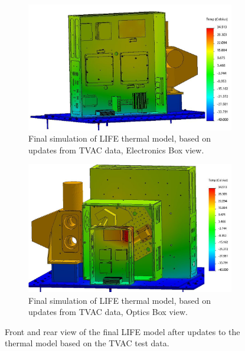 \begin{figure}
    \centering
    \begin{subfigure}[h]{0.9\textwidth}
        \centering
        \includegraphics[width=\textwidth]{chap3_images/LIFE_FINAL_SIMS/Test_22_EBox_FIXED.png}
        \caption{Final simulation of LIFE thermal model, based on updates from TVAC data, Electronics Box view.}
        \label{fig:LIFE_V5_FINAL_TVAC_TA_EBOX}
    \end{subfigure}
    \begin{subfigure}[h]{0.9\textwidth}
        \centering
        \includegraphics[width=\textwidth]{chap3_images/LIFE_FINAL_SIMS/Test_22_BBEbox_FIXED.png}
        \caption{Final simulation of LIFE thermal model, based on updates from TVAC data, Optics Box view.}
        \label{fig:LIFE_V5_FINAL_TVAC_TA_OBOX}
    \end{subfigure}
    \caption{Front and rear view of the final LIFE model after updates to the thermal model based on the TVAC test data.}
    \label{LIFE_V5_FINAL_TVAC_TA}
\end{figure}

